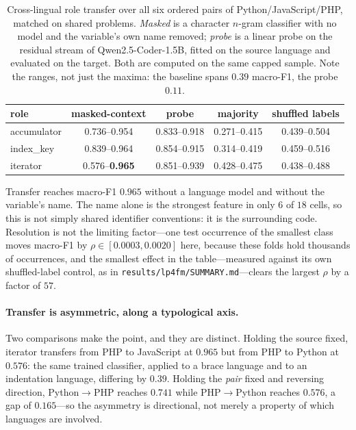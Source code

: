 \begin{table}[t]
\centering
\caption{Cross-lingual role transfer over all six ordered pairs of
Python/JavaScript/PHP, matched on shared problems. \emph{Masked} is a
character $n$-gram classifier with no model and the variable's own name
removed; \emph{probe} is a linear probe on the residual stream of
Qwen2.5-Coder-1.5B, fitted on the source language and evaluated on the target.
Both are computed on the same capped sample. Note the ranges, not just the
maxima: the baseline spans $0.39$ macro-F1, the probe $0.11$.}
\label{tab:crosslang}
\begin{tabular}{lcccc}
\toprule
role & masked-context & probe & majority & shuffled labels \\
\midrule
accumulator & 0.736--0.954 & 0.833--0.918 & 0.271--0.415 & 0.439--0.504 \\
index\_key  & 0.839--0.964 & 0.854--0.915 & 0.314--0.419 & 0.459--0.516 \\
iterator    & 0.576--\textbf{0.965} & 0.851--0.939 & 0.428--0.475 & 0.438--0.488 \\
\bottomrule
\end{tabular}
\end{table}

Transfer reaches macro-F1 $0.965$ without a language model and without the
variable's name. The name alone is the strongest feature in only $6$ of $18$
cells, so this is not simply shared identifier conventions: it is the
surrounding code. Resolution is not the limiting factor---one test occurrence
of the smallest class moves macro-F1 by $\rho \in [0.0003, 0.0020]$ here,
because these folds hold thousands of occurrences, and the smallest effect in
the table---measured against its own shuffled-label control, as in
\texttt{results/lp4fm/SUMMARY.md}---clears the largest $\rho$ by a factor
of $57$.

\paragraph{Transfer is asymmetric, along a typological axis.} Two comparisons
make the point, and they are distinct. Holding the source fixed, iterator
transfers from PHP to JavaScript at $0.965$ but from PHP to Python at
$0.576$: the same trained classifier, applied to a brace language and to an
indentation language, differing by $0.39$. Holding the \emph{pair} fixed and
reversing direction, Python$\rightarrow$PHP reaches $0.741$ while
PHP$\rightarrow$Python reaches $0.576$, a gap of $0.165$---so the asymmetry
is directional, not merely a property of which languages are involved.

